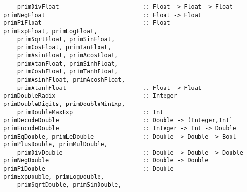 \mbox{\tt \ \ \ \ primDivFloat\ \ \ \ \ \ \ \ \ \ \ \ \ \ \ \ \ \ \ \ \ \ \ \ ::\ Float\ ->\ Float\ ->\ Float}\\
\mbox{\tt primNegFloat\ \ \ \ \ \ \ \ \ \ \ \ \ \ \ \ \ \ \ \ \ \ \ \ \ \ \ \ ::\ Float\ ->\ Float}
\eprogB\noindent\bprogB
\mbox{\tt primPiFloat\ \ \ \ \ \ \ \ \ \ \ \ \ \ \ \ \ \ \ \ \ \ \ \ \ \ \ \ \ ::\ Float}\\
\mbox{\tt primExpFloat,\ primLogFloat,}\\
\mbox{\tt \ \ \ \ primSqrtFloat,\ primSinFloat,}\\
\mbox{\tt \ \ \ \ primCosFloat,\ primTanFloat,}\\
\mbox{\tt \ \ \ \ primAsinFloat,\ primAcosFloat,}\\
\mbox{\tt \ \ \ \ primAtanFloat,\ primSinhFloat,}\\
\mbox{\tt \ \ \ \ primCoshFloat,\ primTanhFloat,}\\
\mbox{\tt \ \ \ \ primAsinhFloat,\ primAcoshFloat,}\\
\mbox{\tt \ \ \ \ primAtanhFloat\ \ \ \ \ \ \ \ \ \ \ \ \ \ \ \ \ \ \ \ \ \ ::\ Float\ ->\ Float}
\eprogB\noindent\bprogB
\mbox{\tt primDoubleRadix\ \ \ \ \ \ \ \ \ \ \ \ \ \ \ \ \ \ \ \ \ \ \ \ \ ::\ Integer}\\
\mbox{\tt primDoubleDigits,\ primDoubleMinExp,}\\
\mbox{\tt \ \ \ \ primDoubleMaxExp\ \ \ \ \ \ \ \ \ \ \ \ \ \ \ \ \ \ \ \ ::\ Int}\\
\mbox{\tt primDecodeDouble\ \ \ \ \ \ \ \ \ \ \ \ \ \ \ \ \ \ \ \ \ \ \ \ ::\ Double\ ->\ (Integer,Int)}\\
\mbox{\tt primEncodeDouble\ \ \ \ \ \ \ \ \ \ \ \ \ \ \ \ \ \ \ \ \ \ \ \ ::\ Integer\ ->\ Int\ ->\ Double}\\
\mbox{\tt primEqDouble,\ primLeDouble\ \ \ \ \ \ \ \ \ \ \ \ \ \ ::\ Double\ ->\ Double\ ->\ Bool}\\
\mbox{\tt primPlusDouble,\ primMulDouble,}\\
\mbox{\tt \ \ \ \ primDivDouble\ \ \ \ \ \ \ \ \ \ \ \ \ \ \ \ \ \ \ \ \ \ \ ::\ Double\ ->\ Double\ ->\ Double}\\
\mbox{\tt primNegDouble\ \ \ \ \ \ \ \ \ \ \ \ \ \ \ \ \ \ \ \ \ \ \ \ \ \ \ ::\ Double\ ->\ Double}\\
\mbox{\tt primPiDouble\ \ \ \ \ \ \ \ \ \ \ \ \ \ \ \ \ \ \ \ \ \ \ \ \ \ \ \ ::\ Double}\\
\mbox{\tt primExpDouble,\ primLogDouble,}\\
\mbox{\tt \ \ \ \ primSqrtDouble,\ primSinDouble,}\\
